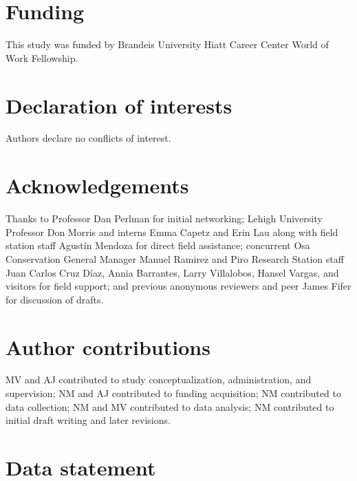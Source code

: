 \documentclass[
  12pt,
]{article}
\begin{document}
\hypertarget{funding}{%
\section*{Funding}\label{funding}}

This study was funded by Brandeis University Hiatt Career Center World of Work Fellowship.

\hypertarget{declaration-of-interests}{%
\section*{Declaration of interests}\label{declaration-of-interests}}

Authors declare no conflicts of interest.

\hypertarget{acknowledgements}{%
\section*{Acknowledgements}\label{acknowledgements}}

Thanks to Professor Dan Perlman for initial networking; Lehigh University Professor Don Morris and interns Emma Capetz and Erin Lau along with field station staff Agustín Mendoza for direct field assistance; concurrent Osa Conservation General Manager Manuel Ramirez and Piro Research Station staff Juan Carlos Cruz Díaz, Annia Barrantes, Larry Villalobos, Hansel Vargas, and visitors for field support; and previous anonymous reviewers and peer James Fifer for discussion of drafts.

\hypertarget{author-contributions}{%
\section*{Author contributions}\label{author-contributions}}

MV and AJ contributed to study conceptualization, administration, and supervision; NM and AJ contributed to funding acquisition; NM contributed to data collection; NM and MV contributed to data analysis; NM contributed to initial draft writing and later revisions.

\hypertarget{data-statement}{%
\section*{Data statement}\label{data-statement}}
\end{document}
